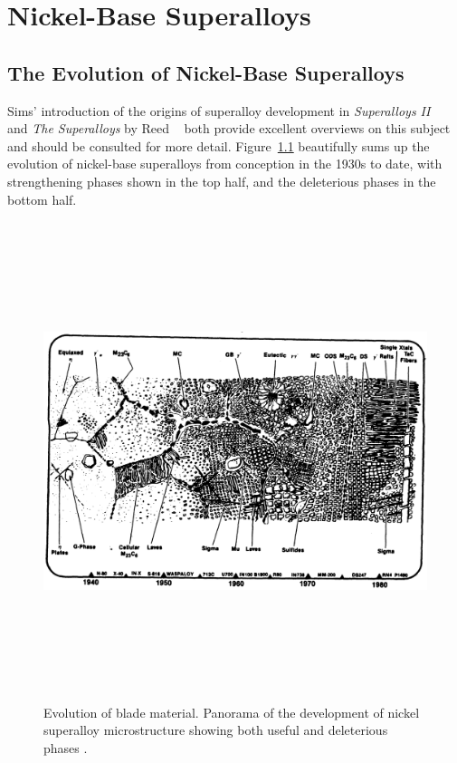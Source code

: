\chapter{Nickel-Base Superalloys}
\section{The Evolution of Nickel-Base Superalloys}

Sims' introduction of the origins of superalloy development in \emph{Superalloys II} ~\cite{sims87} and \emph{The Superalloys} by Reed ~\cite{reed06} both provide excellent overviews on this subject and should be consulted for more detail.  Figure~\ref{fig:evolution} beautifully sums up the evolution of nickel-base superalloys from conception in the 1930s to date, with strengthening phases shown in the top half, and the deleterious phases in the bottom half.
%
\begin{figure}[htbp]
\begin{center}
\includegraphics[height=5.5in, angle=90.6]{SuperalloyEvolution}
\caption{Evolution of blade material. Panorama of the development of nickel superalloy microstructure showing both useful and deleterious phases \cite{sims87}.}
\label{fig:evolution}
\end{center}
\end{figure}
